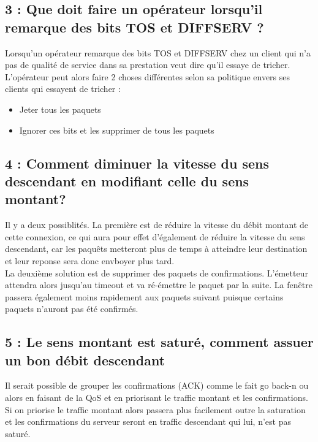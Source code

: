 \documentclass{article}
\begin{document}
\subsection*{3 : Que doit faire un opérateur lorsqu'il remarque des bits TOS et DIFFSERV ?}

Lorsqu'un opérateur remarque des bits TOS \cite{ToS} et DIFFSERV \cite{DiffServ} chez un client qui n'a pas de qualité de service dans sa prestation veut dire qu'il essaye de tricher.\\

L'opérateur peut alors faire 2 choses différentes selon sa politique envers ses clients qui essayent de tricher : 

\begin{itemize}
 	\item Jeter tous les paquets
 	\item Ignorer ces bits et les supprimer de tous les paquets
\end{itemize}

\subsection*{4 : Comment diminuer la vitesse du sens descendant en modifiant celle du sens montant?}

Il y a deux possiblités. La première est de réduire la vitesse du débit montant de cette connexion, ce qui aura pour effet d'également de réduire la vitesse du sens descendant, car les paquêts metteront plus de temps à atteindre leur destination et leur reponse sera donc envboyer plus tard.\\

La deuxième solution  est de supprimer des paquets de confirmations. L'émetteur attendra alors jusqu'au timeout et va ré-émettre le paquet par la suite. La fenêtre passera également moins rapidement aux paquets suivant puisque certains paquets n'auront pas été confirmés.

\subsection*{5 : Le sens montant est saturé, comment assuer un bon débit descendant}

Il serait possible de grouper les confirmations (ACK) comme le fait go back-n\cite{GoBackN} ou alors en faisant de la QoS et en priorisant le traffic montant et les confirmations.\\

Si on priorise le traffic montant alors passera plus facilement outre la saturation et les confirmations du serveur seront en traffic descendant qui lui, n'est pas saturé.
\end{document}
